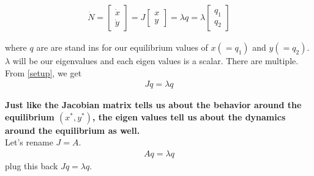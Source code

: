 \documentclass{article}
\begin{document}
\begin{align}
    \dot N = \begin{bmatrix}
        \dot x\\
        \dot y
\end{bmatrix}  = J \begin{bmatrix}
        x\\
        y
\end{bmatrix} = \lambda q  = \lambda \begin{bmatrix}
        q_1\\
        q_2
\end{bmatrix} \label{setup}
\end{align}

where $q$ are are stand ins for our equilibrium values of $x ( = q_1)$ and $y (= q_2)$. $\lambda$ will be our eigenvalues and each eigen values is a scalar. There are multiple. \\

From \ref{setup}, we get 
\begin{align}
    Jq = \lambda q
\end{align}

\textbf{Just like the Jacobian matrix tells us about the behavior around the equilibrium $(x^*, y^*)$, the eigen values tell us about the dynamics around the equilibrium as well.} \\


Let's rename $J = A$. 
\begin{align}
    Aq = \lambda q
\end{align}
plug this back $Jq = \lambda q$. \\
\end{document}
